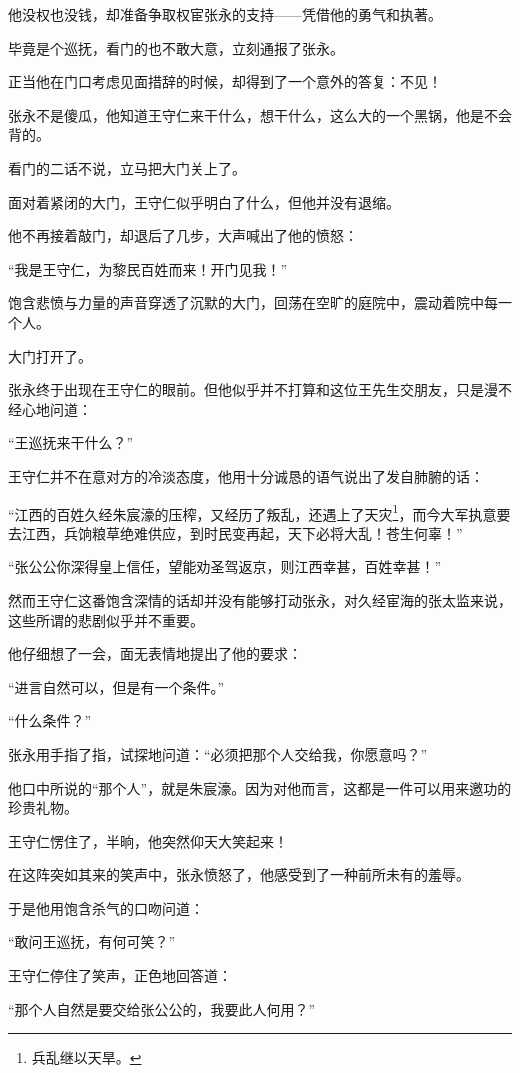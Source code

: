\begin{multicols}{\theparacolNo}
		他没权也没钱，却准备争取权宦张永的支持——凭借他的勇气和执著。

		毕竟是个巡抚，看门的也不敢大意，立刻通报了张永。

		正当他在门口考虑见面措辞的时候，却得到了一个意外的答复：不见！

		张永不是傻瓜，他知道王守仁来干什么，想干什么，这么大的一个黑锅，他是不会背的。

		看门的二话不说，立马把大门关上了。

		面对着紧闭的大门，王守仁似乎明白了什么，但他并没有退缩。

		他不再接着敲门，却退后了几步，大声喊出了他的愤怒：

		“我是王守仁，为黎民百姓而来！开门见我！”

		饱含悲愤与力量的声音穿透了沉默的大门，回荡在空旷的庭院中，震动着院中每一个人。

		大门打开了。

		张永终于出现在王守仁的眼前。但他似乎并不打算和这位王先生交朋友，只是漫不经心地问道：

		“王巡抚来干什么？”

		王守仁并不在意对方的冷淡态度，他用十分诚恳的语气说出了发自肺腑的话：

		“江西的百姓久经朱宸濠的压榨，又经历了叛乱，还遇上了天灾\footnote{兵乱继以天旱。}，而今大军执意要去江西，兵饷粮草绝难供应，到时民变再起，天下必将大乱！苍生何辜！”

		“张公公你深得皇上信任，望能劝圣驾返京，则江西幸甚，百姓幸甚！”

		然而王守仁这番饱含深情的话却并没有能够打动张永，对久经宦海的张太监来说，这些所谓的悲剧似乎并不重要。

		他仔细想了一会，面无表情地提出了他的要求：

		“进言自然可以，但是有一个条件。”

		“什么条件？”

		张永用手指了指，试探地问道：“必须把那个人交给我，你愿意吗？”

		他口中所说的“那个人”，就是朱宸濠。因为对他而言，这都是一件可以用来邀功的珍贵礼物。

		王守仁愣住了，半晌，他突然仰天大笑起来！

		在这阵突如其来的笑声中，张永愤怒了，他感受到了一种前所未有的羞辱。

		于是他用饱含杀气的口吻问道：

		“敢问王巡抚，有何可笑？”

		王守仁停住了笑声，正色地回答道：

		“那个人自然是要交给张公公的，我要此人何用？”


\end{multicols}

